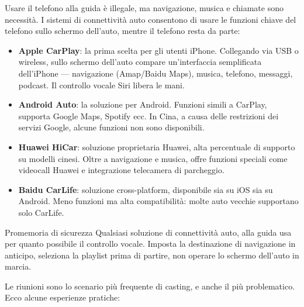 Usare il telefono alla guida è illegale, ma navigazione, musica e chiamate sono necessità. I sistemi di connettività auto consentono di usare le funzioni chiave del telefono sullo schermo dell'auto, mentre il telefono resta da parte:

\begin{itemize}
  \item \textbf{Apple CarPlay}: la prima scelta per gli utenti iPhone. Collegando via USB o wireless, sullo schermo dell'auto compare un'interfaccia semplificata dell'iPhone — navigazione (Amap/Baidu Maps), musica, telefono, messaggi, podcast. Il controllo vocale Siri libera le mani.
  \item \textbf{Android Auto}: la soluzione per Android. Funzioni simili a CarPlay, supporta Google Maps, Spotify ecc. In Cina, a causa delle restrizioni dei servizi Google, alcune funzioni non sono disponibili.
  \item \textbf{Huawei HiCar}: soluzione proprietaria Huawei, alta percentuale di supporto su modelli cinesi. Oltre a navigazione e musica, offre funzioni speciali come videocall Huawei e integrazione telecamera di parcheggio.
  \item \textbf{Baidu CarLife}: soluzione cross-platform, disponibile sia su iOS sia su Android. Meno funzioni ma alta compatibilità: molte auto vecchie supportano solo CarLife.
\end{itemize}

\begin{tcbwarn}{Promemoria di sicurezza}
Qualsiasi soluzione di connettività auto, alla guida usa per quanto possibile il controllo vocale. Imposta la destinazione di navigazione in anticipo, seleziona la playlist prima di partire, non operare lo schermo dell'auto in marcia.

\end{tcbwarn}


Le riunioni sono lo scenario più frequente di casting, e anche il più problematico. Ecco alcune esperienze pratiche:

